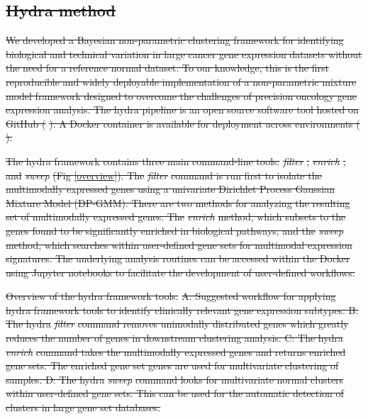 \documentclass[10pt,letterpaper]{article}
\providecommand{\DIFdeltex}[1]{{\protect\color{red}\sout{#1}}}                      %
\providecommand{\DIFdelFL}[1]{\DIFdel{#1}} %
\providecommand{\DIFdel}[1]{\texorpdfstring{\DIFdeltex{#1}}{}} %
\begin{document}
\subsection*{\DIFdel{Hydra method}}
\DIFdel{We developed a Bayesian non-parametric clustering framework for identifying biological and technical variation in large cancer gene expression datasets without the need for a reference normal dataset. To our knowledge, this is the first reproducible and widely deployable implementation of a non-parametric mixture model framework designed to overcome the challenges of precision oncology gene expression analysis. The hydra pipeline is an open source software tool hosted on GitHub (}%
\DIFdel{). A Docker container is available for deployment across environments (}%
\DIFdel{).
}%

\DIFdel{The hydra framework contains three main command-line tools: }\textit{\DIFdel{filter}}%
\DIFdel{, }\textit{\DIFdel{enrich}}%
\DIFdel{, and }\textit{\DIFdel{sweep}} %
\DIFdel{(Fig \ref{overview}). The }\textit{\DIFdel{filter}} %
\DIFdel{command is run first to isolate the multimodally expressed genes using a univariate Dirichlet Process Gaussian Mixture Model (DP-GMM). There are two methods for analyzing the resulting set of multimodally expressed genes. The }\textit{\DIFdel{enrich}} %
\DIFdel{method, which subsets to the genes found to be significantly enriched in biological pathways, and the }\textit{\DIFdel{sweep}} %
\DIFdel{method, which searches within user-defined gene sets for multimodal expression signatures. The underlying analysis routines can be accessed within the Docker using Jupyter notebooks to facilitate the development of user-defined workflows.
}%

{%
\DIFdelFL{Overview of the hydra framework tools.}%
\DIFdelFL{A: Suggested workflow for applying hydra framework tools to identify clinically relevant gene expression subtypes. B: The hydra }\textit{\DIFdelFL{filter}} %
\DIFdelFL{command removes unimodally distributed genes which greatly reduces the number of genes in downstream clustering analysis. C: The hydra }\textit{\DIFdelFL{enrich}} %
\DIFdelFL{command takes the multimodally expressed genes and returns enriched gene sets. The enriched gene set genes are used for multivariate clustering of samples. D: The hydra
	    }\textit{\DIFdelFL{sweep}} %
\DIFdelFL{command looks for multivariate normal clusters within user-defined gene sets. This can be used for the automatic detection of clusters in large gene set databases.
		}%
}
\end{document}
